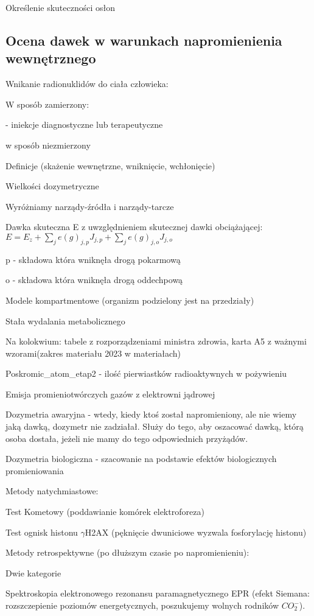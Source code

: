 \documentclass{article}
\begin{document}
Określenie skuteczności osłon

\subsection{Ocena dawek w warunkach napromienienia wewnętrznego}

Wnikanie radionuklidów do ciała człowieka:

W sposób zamierzony:

- iniekcje diagnostyczne lub terapeutyczne

w sposób niezmierzony

Definicje (skażenie wewnętrzne, wniknięcie, wchłonięcie)

Wielkości dozymetryczne

Wyróżniamy narządy-źródła i narządy-tarcze

Dawka skuteczna E z uwzględnieniem skutecznej dawki obciążającej: $E = E_z + \sum_{j}^{}e(g)_{j,p}J_{j,p} + \sum_{j}^{}e(g)_{j,o}J_{j,o}$

p - składowa która wniknęła drogą pokarmową

o - składowa która wniknęła drogą oddechpową

Modele kompartmentowe (organizm podzielony jest na przedziały)

Stała wydalania metabolicznego

Na kolokwium: tabele z rozporządzeniami ministra zdrowia, karta A5 z ważnymi wzorami(zakres materiału 2023 w materiałach)

Poskromic\_atom\_etap2 - ilość pierwiastków radioaktywnych w pożywieniu

Emisja promieniotwórczych gazów z elektrowni jądrowej

Dozymetria awaryjna - wtedy, kiedy ktoś został napromieniony, ale nie wiemy jaką dawką, dozymetr nie zadziałał. Służy do tego, aby oszacować dawką, którą osoba dostała, jeżeli nie mamy do tego odpowiednich przyżądów.

Dozymetria biologiczna - szacowanie na podstawie efektów biologicznych promieniowania

Metody natychmiastowe:

Test Kometowy (poddawianie komórek elektroforeza)

Test ognisk histonu $\gamma$H2AX (pęknięcie dwuniciowe wyzwala fosforylację histonu)

Metody retrospektywne (po dłuższym czasie po napromienieniu):

Dwie kategorie

Spektroskopia elektronowego rezonansu paramagnetycznego EPR (efekt Siemana: rozszczepienie poziomów energetycznych, poszukujemy wolnych rodników $CO_2^-$).
\end{document}
